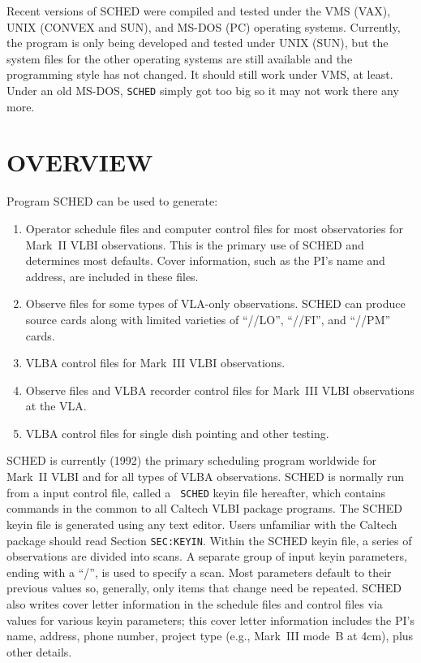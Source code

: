 Recent versions of {\sc SCHED} were compiled and tested under the VMS
(VAX), UNIX (CONVEX and SUN), and MS-DOS (PC) operating systems.
Currently, the program is only being developed and tested under UNIX
(SUN), but the system files for the other operating systems are still
available and the programming style has not changed. It should still
work under VMS, at least. Under an old MS-DOS, {\tt SCHED} simply got
too big so it may not work there any more.

\section{OVERVIEW}
\label{SEC:OVER}

Program {\sc SCHED} can be used to generate:
\begin{enumerate}
\item Operator schedule files and computer control files for most 
observatories for Mark~II VLBI observations. This is the primary use
of {\sc SCHED} and determines most defaults. Cover information, such
as the PI's name and address, are included in these files.

\item Observe files for some types of VLA-only observations. {\sc 
SCHED} can produce source cards along with limited varieties of
``//LO'', ``//FI'', and ``//PM'' cards.

\item VLBA control files for Mark~III VLBI observations.

\item Observe files and VLBA recorder control files for Mark~III VLBI 
observations at the VLA.

\item VLBA control files for single dish pointing and other testing.
\end{enumerate}

{\sc SCHED} is currently (1992) the primary scheduling program
worldwide for Mark~II VLBI and for all types of VLBA observations.
{\sc SCHED} is normally run from a input control file, called a {\tt
SCHED} keyin file hereafter, which contains commands in the 
 common to all Caltech 
VLBI package programs. The {\sc SCHED}
keyin file is generated using any text editor. Users unfamiliar with
the Caltech package should read Section {\tt SEC:KEYIN}. Within the
{\sc SCHED} keyin file, a series of observations are divided into
scans. A separate group of input keyin parameters, ending with a
``/'', is used to specify a scan. Most parameters default to their
previous values so, generally, only items that change need be
repeated. {\sc SCHED} also writes cover letter information in the
schedule files and control files via values for various keyin
parameters; this cover letter information includes the PI's name,
address, phone number, project type (e.g., Mark~III mode~B at 4cm),
plus other details.

